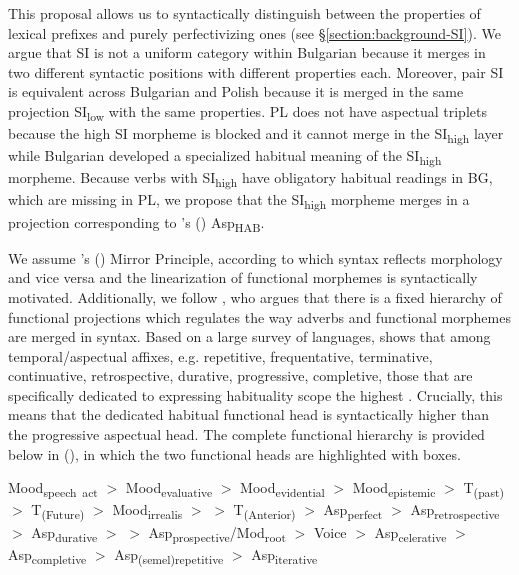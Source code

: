 \documentclass[output=paper,colorlinks,citecolor=brown]{langscibook}
\begin{document}
\noindent This proposal allows us to syntactically distinguish between the properties of lexical prefixes and purely perfectivizing ones
(see \S \ref{section:background-SI}). We argue that SI is not a uniform category within Bulgarian because it merges in two different syntactic positions with different properties each. Moreover, pair SI is equivalent across Bulgarian and Polish because it is merged in the same projection SI\textsubscript{low} with the same properties. PL does not have aspectual triplets because the high SI morpheme is blocked and it cannot merge in the SI\textsubscript{high} layer while Bulgarian developed a specialized habitual meaning of the SI\textsubscript{high} morpheme. Because verbs with SI\textsubscript{high} have obligatory habitual readings in BG, which are missing in PL, we propose that the SI\textsubscript{high} morpheme merges in a projection corresponding to \citeauthor{cinque1999}'s (\citeyear{cinque1999}) Asp\textsubscript{HAB}. 

We assume \citeauthor{baker85}'s (\citeyear{baker85}) Mirror Principle, according to which syntax reflects morphology and vice versa and the linearization of functional morphemes is syntactically motivated. Additionally, we follow \citet{cinque1999}, who argues that there is a fixed hierarchy of functional projections which regulates the way adverbs and functional morphemes are merged in syntax. Based on a large survey of languages, \citeauthor{cinque1999} shows that among temporal/aspectual affixes, e.g. repetitive, frequentative, terminative, continuative, retrospective, durative, progressive, completive, those that are specifically dedicated to expressing habituality scope the highest \citep[][p. 56; 70]{cinque1999}. Crucially, this means that the dedicated habitual functional head is syntactically higher than the progressive aspectual head. The complete functional hierarchy is provided below in (), in which the two functional heads are highlighted with boxes.

\ea \label{cinque:hierarchy} Mood\textsubscript{speech~act} $>$ Mood\textsubscript{evaluative} $>$  
Mood\textsubscript{evidential} $>$ 
Mood\textsubscript{epistemic} $>$ 
T\textsubscript{(past)} $>$ 
T\textsubscript{(Future)} $>$
Mood\textsubscript{irrealis} $>$
 $>$
T\textsubscript{(Anterior)} $>$
Asp\textsubscript{perfect} $>$
 Asp\textsubscript{retrospective} $>$
 Asp\textsubscript{durative} $>$
  $>$
 Asp\textsubscript{prospective}/Mod\textsubscript{root} $>$
 Voice $>$ 
 Asp\textsubscript{celerative} $>$ 
 Asp\textsubscript{completive} $>$
 Asp\textsubscript{(semel)repetitive} $>$
 Asp\textsubscript{iterative} \\
%
 \hfill \citet[76]{cinque1999}
\z
\end{document}

